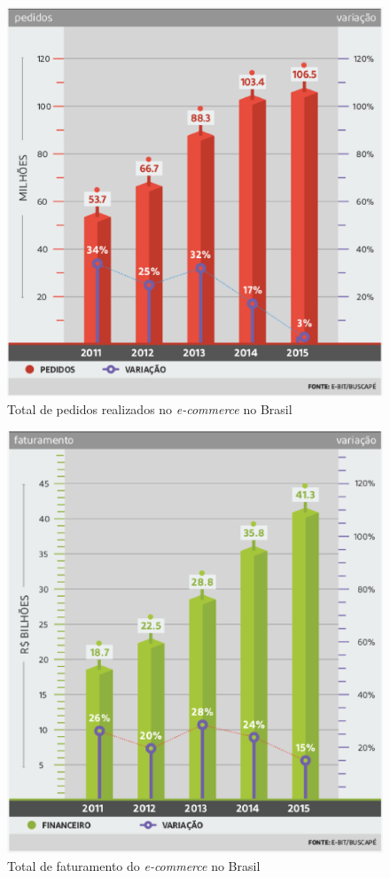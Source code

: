 \documentclass[a4paper,12pt]{monografia}
\begin{document}
\begin{figure}[H]
\centering
\includegraphics[width=15cm]{img/webshoppers/total-pedidos.eps}
\caption{Total de pedidos realizados no \textit{e-commerce} no Brasil}
\label{figura:pedidos}
\end{figure}

\begin{figure}[H]
\centering
\includegraphics[width=15cm]{img/webshoppers/faturamento.eps}
\caption{Total de faturamento do \textit{e-commerce} no Brasil}
\label{figura:vendas}
\end{figure}
\end{document}
